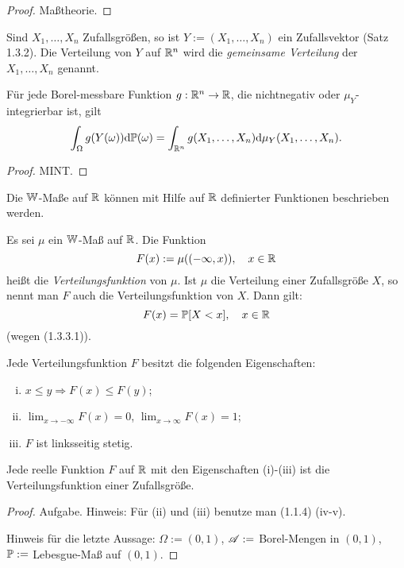 \begin{proof}
  Maßtheorie.
\end{proof}

\begin{defn}
  Sind $X_1, \ldots, X_n$ Zufallsgrößen, so ist $Y := (X_1, \ldots, X_n)$ ein
  Zufallsvektor (Satz 1.3.2). Die Verteilung von $Y$ auf $\mathbb{R}^n$ wird die
  \emph{gemeinsame Verteilung} der $X_1, \ldots, X_n$ genannt.
\end{defn}

\begin{thm}
  Für jede Borel-messbare Funktion $g: \mathbb{R}^n \to \mathbb{R}$, die nichtnegativ oder
  $\mu_Y$-integrierbar ist, gilt
  \[ \int_\Omega g(Y(\omega)) \mathrm{d} \mathbb{P}(\omega) = \int_{\mathbb{R}^n} g(X_1,
    \ldots, X_n) \mathrm{d} \mu_Y (X_1, \ldots, X_n). \]
\end{thm}

\begin{proof}
  MINT.
\end{proof}

Die $\mathbb{W}$-Maße auf $\mathbb{R}$  können mit Hilfe auf $\mathbb{R}$ definierter Funktionen beschrieben werden.

\begin{defn}
  Es sei $\mu$ ein $\mathbb{W}$-Maß auf $\mathbb{R}$. Die Funktion
  \[ F(x) := \mu((-\infty, x)), \quad x \in \mathbb{R} \]
  heißt die \emph{Verteilungsfunktion} von $\mu$. Ist $\mu$ die Verteilung einer
  Zufallsgröße $X$, so nennt man $F$ auch die Verteilungsfunktion von $X$. Dann gilt:
  \[ F(x) = \mathbb{P}[X<x], \quad x \in \mathbb{R} \]
  (wegen (1.3.3.1)).
\end{defn}

\begin{lem}
  Jede Verteilungsfunktion $F$ besitzt die folgenden Eigenschaften:
  \begin{enumerate}[(i)]
  \item $x \le y \Rightarrow F(x) \le F(y)$;
  \item $\lim_{x \to - \infty} F(x) = 0$, $\lim_{x \to \infty} F(x) = 1$;
  \item $F$ ist linksseitig stetig.
  \end{enumerate}
  Jede reelle Funktion $F$ auf $\mathbb{R}$ mit den Eigenschaften (i)-(iii) ist die
  Verteilungsfunktion einer Zufallsgröße.
  \label{lem:1_3_9}
\end{lem}

\begin{proof}
  Aufgabe. Hinweis: Für (ii) und (iii) benutze man (1.1.4) (iv-v).

  Hinweis für die letzte Aussage: $\Omega := (0, 1)$, $\mathscr{A} :=$ Borel-Mengen in $(0, 1)$,
  $\mathbb{P} :=$ Lebesgue-Maß auf $(0, 1)$.
\end{proof}


